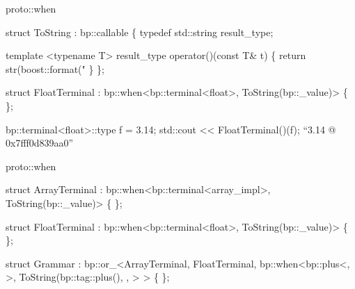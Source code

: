 \documentclass[9pt]{beamer}
\begin{document}

\begin{frame}[fragile]{proto::when}
\begin{semiverbatim}
struct ToString : bp::callable
\{
  typedef std::string result_type;
  
  template <typename T>
  result_type operator()(const T& t)
  \{
    return str(boost::format("%
  \}
\};

struct FloatTerminal
  : bp::when<bp::terminal<float>, ToString(bp::_value)>
\{ \};

bp::terminal<float>::type f = {3.14}; 
std::cout << FloatTerminal()(f);  
``3.14 @ 0x7fff0d839aa0''

\end{semiverbatim}
\note{ }
\end{frame}


\begin{frame}[fragile]{proto::when}
\begin{semiverbatim}
struct \alert<3>{ArrayTerminal}
  : bp::when<\alert<2,8>{bp::terminal<\alert<9>{array_impl}>}, \alert<11>{ToString(bp::_value)}>
\{ \};

struct \alert<5>{FloatTerminal}
  : bp::when<\alert<4>{bp::terminal<float>}, ToString(bp::_value)>
\{ \};

struct Grammar : 
  bp::or_<ArrayTerminal,
          FloatTerminal,
          bp::when<\alert<6>{bp::plus<, 
                            >},
                   \alert<7>{ToString(\alert<14>{bp::tag::plus()},
                            ,
                            }>
	    >
\{ \};      
\end{semiverbatim}
\note{ }
\end{frame}

\end{document}

